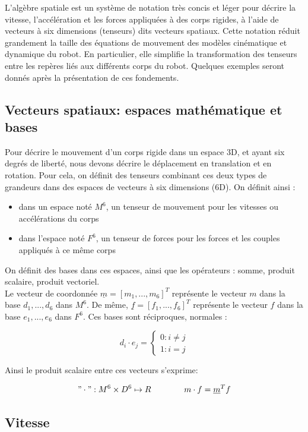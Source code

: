 \documentclass{report}
\begin{document}
L'algèbre spatiale est un système de notation très concis et léger pour décrire la vitesse, l'accélération et les forces appliquées à des corps rigides, à l'aide de vecteurs à six dimensions (tenseurs) dits vecteurs spatiaux. Cette notation réduit grandement la taille des équations de mouvement des modèles cinématique et dynamique du robot. En particulier, elle simplifie la transformation des tenseurs entre les repères liés aux différents corps du robot. Quelques exemples seront donnés après la présentation de ces fondements.\\


\subsection{Vecteurs spatiaux: espaces mathématique et bases}

Pour décrire le mouvement d'un corps rigide dans un espace 3D, et ayant six degrés de liberté, nous devons décrire le déplacement en translation et en rotation. Pour cela, on définit des tenseurs combinant ces deux types de grandeurs dans des espaces de vecteurs à six dimensions (6D). On définit ainsi :\\
\begin{itemize}
\item dans un espace noté $M^{6}$, un tenseur de mouvement pour les vitesses ou accélérations du corps
\item dans l'espace noté $F^{6}$, un tenseur de forces pour les forces et les couples appliqués à ce même corps
\end{itemize}
On définit des bases dans ces espaces, ainsi que les opérateurs : somme, produit scalaire, produit vectoriel.\\
Le vecteur de coordonnée $\underline{m}=[m_{1},...,m_{6}]^T$ représente le vecteur $m$ dans la base ${d_{1},...,d_{6}}$ dans $M^{6}$.
De même, $\underline{f}=[f_{1},...,f_{6}]^T$ représente le vecteur $f$ dans la base ${e_{1},...,e_{6}}$ dans $F^{6}$.
Ces bases sont réciproques, normales :

$$
d_{i}\cdot e_{j}=
\begin{cases}
0 \colon i \neq j\\
1 \colon i = j
\end{cases}
$$

Ainsi le produit scalaire entre ces vecteurs s'exprime:

$$
"\cdot" : M^{6} \times D^{6} \mapsto R
\qquad
\qquad
m \cdot f = \underline{m}^T f
$$

\subsection{Vitesse}\label{ch_algSpa_Vitesse}
\end{document}
